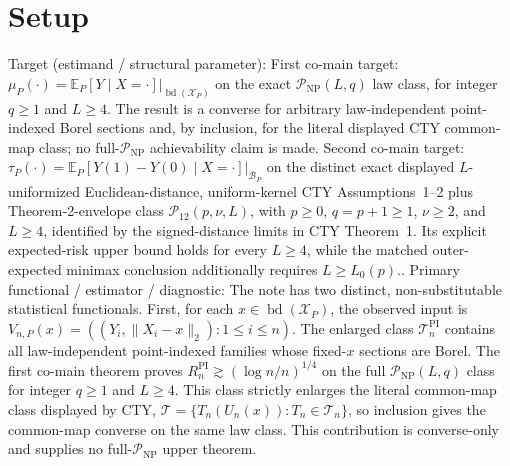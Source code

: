 \documentclass{article}
\begin{document}
\section{Setup}

Target (estimand / structural parameter): First co-main target: \(\mu_P(\cdot)=\mathbb E_P[Y\mid X=\cdot]\big|_{\operatorname{bd}(\mathcal X_P)}\) on the exact \(\mathcal P_{\mathrm{NP}}(L,q)\) law class, for integer \(q\geq1\) and \(L\geq4\).  The result is a converse for arbitrary law-independent point-indexed Borel sections and, by inclusion, for the literal displayed CTY common-map class; no full-\(\mathcal P_{\mathrm{NP}}\) achievability claim is made.  Second co-main target: \(\tau_P(\cdot)=\mathbb E_P[Y(1)-Y(0)\mid X=\cdot]\big|_{\mathcal B_P}\) on the distinct exact displayed \(L\)-uniformized Euclidean-distance, uniform-kernel CTY Assumptions~1--2 plus Theorem-2-envelope class \(\mathcal P_{12}(p,\nu,L)\), with \(p\geq0\), \(q=p+1\geq1\), \(\nu\geq2\), and \(L\geq4\), identified by the signed-distance limits in CTY Theorem~1.  Its explicit expected-risk upper bound holds for every \(L\geq4\), while the matched outer-expected minimax conclusion additionally requires \(L\geq L_0(p)\)..
Primary functional / estimator / diagnostic: The note has two distinct, non-substitutable statistical functionals.  First, for each \(x\in\operatorname{bd}(\mathcal X_P)\), the observed input is \(V_{n,P}(x)=((Y_i,\lVert X_i-x\rVert_2):1\leq i\leq n)\).  The enlarged class \(\mathcal T_n^{\mathrm{PI}}\) contains all law-independent point-indexed families whose fixed-\(x\) sections are Borel.  The first co-main theorem proves \(R_n^{\mathrm{PI}}\gtrsim(\log n/n)^{1/4}\) on the full \(\mathcal P_{\mathrm{NP}}(L,q)\) class for integer \(q\geq1\) and \(L\geq4\).  This class strictly enlarges the literal common-map class displayed by CTY, \(\mathcal T=\{T_n(U_n(x)):T_n\in\mathcal T_n\}\), so inclusion gives the common-map converse on the same law class.  This contribution is converse-only and supplies no full-\(\mathcal P_{\mathrm{NP}}\) upper theorem.
\end{document}
